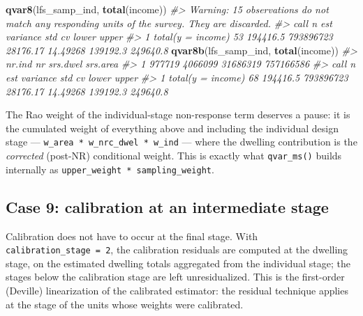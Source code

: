 \documentclass[
]{article}
\newenvironment{Shaded}{\begin{snugshade}}{\end{snugshade}}
\newcommand{\CommentTok}[1]{\textcolor[rgb]{0.56,0.35,0.01}{\textit{#1}}}
\newcommand{\FunctionTok}[1]{\textcolor[rgb]{0.13,0.29,0.53}{\textbf{#1}}}
\newcommand{\NormalTok}[1]{#1}
\begin{document}
\begin{Shaded}
\begin{Highlighting}[]
\FunctionTok{qvar8}\NormalTok{(lfs\_samp\_ind, }\FunctionTok{total}\NormalTok{(income))}
\CommentTok{\#\textgreater{} Warning: 15 observations do not match any responding units of the survey. They are discarded.}
\CommentTok{\#\textgreater{}                call  n      est  variance      std       cv    lower    upper}
\CommentTok{\#\textgreater{} 1 total(y = income) 53 194416.5 793896723 28176.17 14.49268 139192.3 249640.8}
\FunctionTok{qvar8b}\NormalTok{(lfs\_samp\_ind, }\FunctionTok{total}\NormalTok{(income))}
\CommentTok{\#\textgreater{}   nr.ind      nr srs.dwel  srs.area}
\CommentTok{\#\textgreater{} 1 977719 4066099 31686319 757166586}
\CommentTok{\#\textgreater{}                call  n      est  variance      std       cv    lower    upper}
\CommentTok{\#\textgreater{} 1 total(y = income) 68 194416.5 793896723 28176.17 14.49268 139192.3 249640.8}
\end{Highlighting}
\end{Shaded}

The Rao weight of the individual-stage non-response term deserves a
pause: it is the cumulated weight of everything above and including the
individual design stage --- \texttt{w\_area\ *\ w\_nrc\_dwel\ *\ w\_ind}
--- where the dwelling contribution is the \emph{corrected} (post-NR)
conditional weight. This is exactly what \texttt{qvar\_ms()} builds
internally as \texttt{upper\_weight\ *\ sampling\_weight}.

\subsection{Case 9: calibration at an intermediate
stage}\label{case-9-calibration-at-an-intermediate-stage}

Calibration does not have to occur at the final stage. With
\texttt{calibration\_stage\ =\ 2}, the calibration residuals are
computed at the dwelling stage, on the estimated dwelling totals
aggregated from the individual stage; the stages below the calibration
stage are left unresidualized. This is the first-order (Deville)
linearization of the calibrated estimator: the residual technique
applies at the stage of the units whose weights were calibrated.
\end{document}
